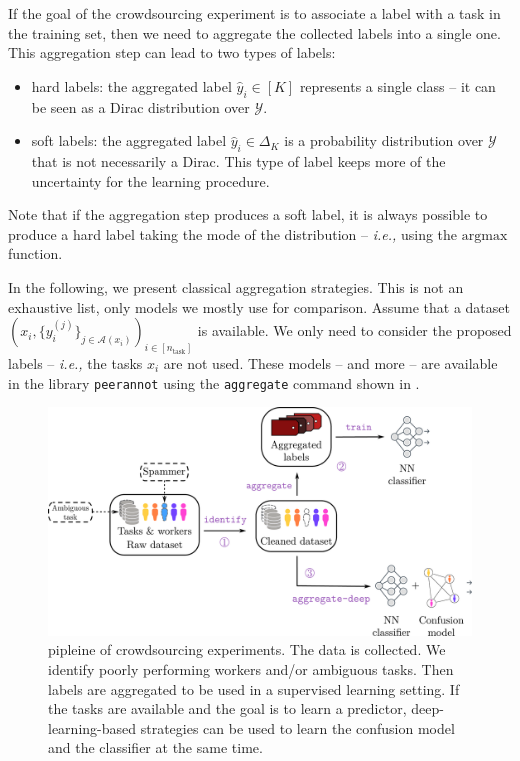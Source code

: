If the goal of the crowdsourcing experiment is to associate a label with a task in the training set, then we need to aggregate the collected labels into a single one.
This aggregation step can lead to two types of labels:
\begin{itemize}
    \item hard labels: the aggregated label $\hat y_i\in [K]$ represents a single class -- it can be seen as a Dirac distribution over $\mathcal{Y}$.
    \item soft labels: the aggregated label $\hat y_i\in\Delta_K$ is a probability distribution over $\mathcal{Y}$ that is not necessarily a Dirac. This type of label keeps more of the uncertainty for the learning procedure.
\end{itemize}
Note that if the aggregation step produces a soft label, it is always possible to produce a hard label taking the mode of the distribution -- \emph{i.e.,} using the $\mathrm{argmax}$ function.

In the following, we present classical aggregation strategies.
This is not an exhaustive list, only models we mostly use for comparison.
Assume that a dataset $\left(x_i, \{y_i^{(j)}\}_{j\in\mathcal{A}(x_i)}\right)_{i\in [n_\text{task}]}$ is available.
We only need to consider the proposed labels -- \emph{i.e.,} the tasks $x_i$ are not used.
These models -- and more -- are available in the library \texttt{peerannot} using the \texttt{aggregate} command shown in .

\begin{figure}[ht]
    \centering
    \includegraphics[width=\textwidth]{chapters/images/strategies_crowd_data.pdf}
    \caption{pipleine of crowdsourcing experiments. The data is collected. We identify poorly performing workers and/or ambiguous tasks. Then labels are aggregated to be used in a supervised learning setting. If the tasks are available and the goal is to learn a predictor, deep-learning-based strategies can be used to learn the confusion model and the classifier at the same time.}
    \label{fig:pipeline_crowdsourcing}
\end{figure}

